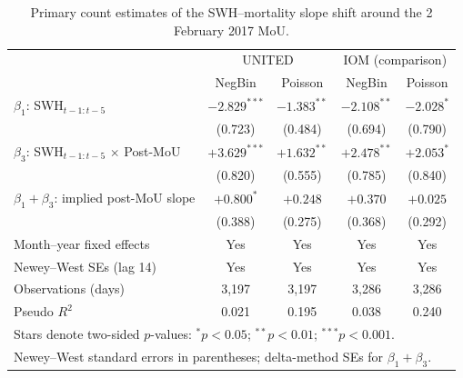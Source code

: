\begin{table}[!htbp]
\centering
\small
\caption{Primary count estimates of the SWH--mortality slope shift around the 2 February 2017 MoU.}
\label{tab:primary}
\begin{tabular}{lcccc}
\hline
                              & \multicolumn{2}{c}{UNITED} & \multicolumn{2}{c}{IOM (comparison)} \\
                              & NegBin & Poisson & NegBin & Poisson \\
\hline
$\beta_1$: SWH$_{t-1:t-5}$            & $-2.829^{***}$ & $-1.383^{**}$ & $-2.108^{**}$ & $-2.028^{*}$ \\
                                      & (0.723) & (0.484) & (0.694) & (0.790) \\
$\beta_3$: SWH$_{t-1:t-5}$ $\times$ Post-MoU & $+3.629^{***}$ & $+1.632^{**}$ & $+2.478^{**}$ & $+2.053^{*}$ \\
                                      & (0.820) & (0.555) & (0.785) & (0.840) \\
$\beta_1+\beta_3$: implied post-MoU slope    & $+0.800^{*}$ & $+0.248$ & $+0.370$ & $+0.025$ \\
                                      & (0.388) & (0.275) & (0.368) & (0.292) \\
\hline
Month--year fixed effects             & Yes            & Yes           & Yes            & Yes          \\
Newey--West SEs (lag 14)              & Yes            & Yes           & Yes            & Yes          \\
Observations (days)                   & 3,197 & 3,197 & 3,286 & 3,286 \\
Pseudo $R^{2}$                        & 0.021 & 0.195 & 0.038 & 0.240 \\
\hline
\multicolumn{5}{l}{\footnotesize Stars denote two-sided $p$-values: $^{*}p<0.05$; $^{**}p<0.01$; $^{***}p<0.001$.} \\
\multicolumn{5}{l}{\footnotesize Newey--West standard errors in parentheses; delta-method SEs for $\beta_1+\beta_3$.} \\
\end{tabular}
\end{table}
